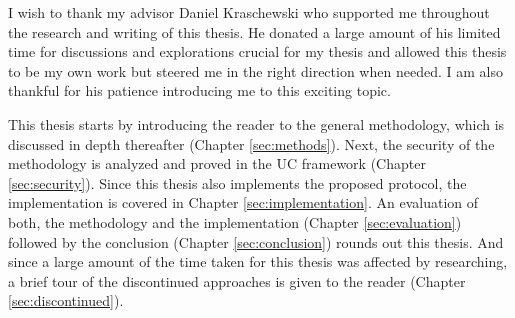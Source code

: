 %
%

I wish to thank my advisor Daniel Kraschewski who supported me throughout the
research and writing of this thesis. He donated a large amount of his limited
time for discussions and explorations crucial for my thesis and allowed this
thesis to be my own work but steered me in the right direction when needed.  I
am also thankful for his patience introducing me to this exciting topic.


%
%

This thesis starts by introducing the reader to the general methodology, which
is discussed in depth thereafter (Chapter \ref{sec:methods}). Next, the security
of the methodology is analyzed and proved in the UC framework (Chapter
\ref{sec:security}). Since this thesis also implements the proposed protocol,
the implementation is covered in Chapter \ref{sec:implementation}. An evaluation
of both, the methodology and the implementation (Chapter \ref{sec:evaluation})
followed by the conclusion (Chapter \ref{sec:conclusion}) rounds out this
thesis.  And since a large amount of the time taken for this thesis was affected
by researching, a brief tour of the discontinued approaches is given to the
reader (Chapter \ref{sec:discontinued}).

